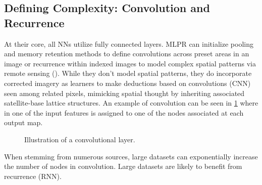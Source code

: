\subsection{Defining Complexity: Convolution and Recurrence} \label{subs:ai1} At their core, all NNs utilize fully connected layers. MLPR can initialize pooling and memory retention methods to define convolutions across preset areas in an image or recurrence within indexed images to model complex spatial patterns via remote sensing (\cite{zhang_deep_2023}). While they don’t model spatial patterns, they do incorporate corrected imagery as learners to make deductions based on convolutions (CNN) seen among related pixels, mimicking spatial thought by inheriting associated satellite-base lattice structures. An example of convolution can be seen in \ref{fig:convolutional-layer} where in one of the input features is assigned to one of the nodes associated at each output map. \begin{figure}[h!]
	\centering
	\caption{Illustration of a convolutional layer.}
	\label{fig:convolutional-layer}
\end{figure} When stemming from numerous sources, large datasets can exponentially increase the number of nodes in convolution. Large datasets are likely to benefit from recurrence (RNN). 

